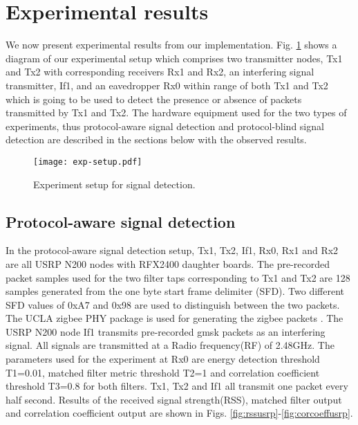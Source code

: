 \documentclass[journal]{IEEEtran}
\begin{document}
\section{Experimental results} \label{sec:results}

We now present experimental results from our implementation. Fig. \ref{fig:exp-setup} shows a diagram of our experimental setup which comprises two transmitter nodes, Tx1 and Tx2 with corresponding receivers Rx1 and Rx2, an interfering signal transmitter, If1, and an eavedropper Rx0 within range of both Tx1 and Tx2 which is going to be used to detect the presence or absence of packets transmitted by Tx1 and Tx2. The hardware equipment used for the two types of experiments, thus protocol-aware signal detection and protocol-blind signal detection are described in the sections below with the observed results.

\begin{figure}[htb]
\begin{center}
	\texttt{[image: exp-setup.pdf]} 
\caption{Experiment setup for signal detection.}
\label{fig:exp-setup}
\end{center}
\end{figure}

\subsection{Protocol-aware signal detection} \label{sec:protaware}
In the protocol-aware signal detection setup, Tx1, Tx2, If1, Rx0, Rx1 and Rx2 are all USRP N200 nodes with RFX2400 daughter boards. The pre-recorded packet samples used for the two filter taps corresponding to Tx1 and Tx2 are 128 samples generated from the one byte start frame delimiter (SFD). Two different SFD values of 0xA7 and 0x98 are used to distinguish between the two packets. The UCLA zigbee PHY package is used for generating the zigbee packets \cite{schmid2006gnu} \cite{choong2009multi}. The USRP N200 node If1 transmits pre-recorded gmsk packets as an interfering signal. All signals are transmitted at a Radio frequency(RF)  of 2.48GHz. The parameters used for the experiment at Rx0 are energy detection threshold T1=0.01, matched filter metric threshold T2=1 and correlation coefficient threshold T3=0.8 for both filters. Tx1, Tx2 and If1 all transmit one packet every half second. Results of the received signal strength(RSS), matched filter output and correlation coefficient output are shown in  Figs. \ref{fig:rssusrp}-\ref{fig:corcoeffusrp}.
\end{document}
